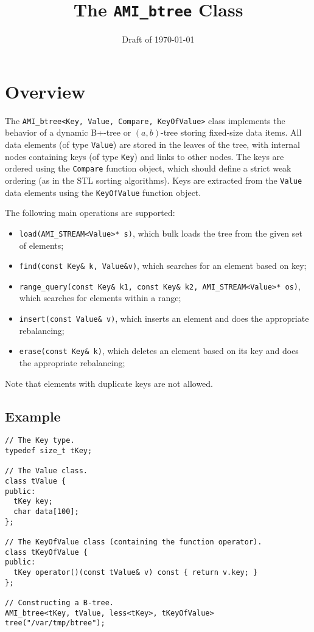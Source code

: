 \documentclass[11pt]{article}
\begin{document}
\title{\bf The {\tt AMI\_btree} Class}
\date{Draft of \today}
\author{}
\maketitle

\section{Overview}
\label{btree:overview}

The {\tt AMI\_btree<Key, Value, Compare, KeyOfValue>} class implements the
behavior of a dynamic B+-tree or $(a,b)$-tree storing fixed-size data
items. All data elements (of type {\tt Value}) are stored in the leaves of
the tree, with internal nodes containing keys (of type {\tt Key}) and links
to other nodes. The keys are ordered using the {\tt Compare} function
object, which should define a strict weak ordering (as in the STL sorting
algorithms). Keys are extracted from the {\tt Value} data elements using
the {\tt KeyOfValue} function object.

The following main operations are supported:
\begin{itemize}

  \item {\tt load(AMI\_STREAM<Value>* s)}, which bulk loads the tree from
  the given set of elements;

  \item {\tt find(const Key\& k, Value\&v)}, which searches for an element
  based on key;

  \item {\tt range\_query(const Key\& k1, const Key\& k2,
  AMI\_STREAM<Value>* os)}, which searches for elements within a range;

  \item {\tt insert(const Value\& v)}, which inserts an element and does
  the appropriate rebalancing;

  \item {\tt erase(const Key\& k)}, which deletes an element based on its
  key and does the appropriate rebalancing;
\end{itemize}

Note that elements with duplicate keys are not allowed.


\subsection{Example}
{\small
\begin{verbatim}
// The Key type.
typedef size_t tKey;

// The Value class.
class tValue {
public:
  tKey key;
  char data[100];
};

// The KeyOfValue class (containing the function operator).
class tKeyOfValue {
public:
  tKey operator()(const tValue& v) const { return v.key; }
};

// Constructing a B-tree.
AMI_btree<tKey, tValue, less<tKey>, tKeyOfValue> tree("/var/tmp/btree");
\end{verbatim}
}
\end{document}
